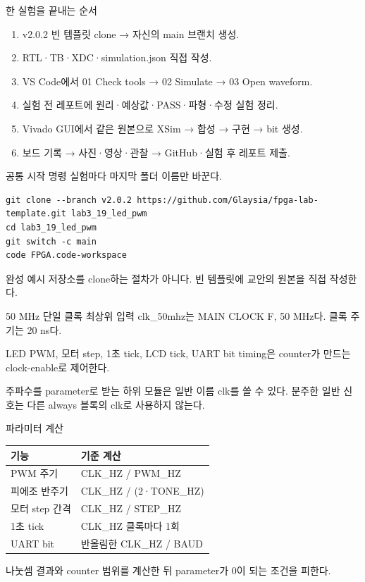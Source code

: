 \begin{frame}{한 실험을 끝내는 순서}
\small
\begin{enumerate}
\item v2.0.2 빈 템플릿 clone → 자신의 main 브랜치 생성.
\item RTL·TB·XDC·simulation.json 직접 작성.
\item VS Code에서 01 Check tools → 02 Simulate → 03 Open waveform.
\item 실험 전 레포트에 원리·예상값·PASS·파형·수정 실험 정리.
\item Vivado GUI에서 같은 원본으로 XSim → 합성 → 구현 → bit 생성.
\item 보드 기록 → 사진·영상·관찰 → GitHub·실험 후 레포트 제출.
\end{enumerate}
\end{frame}
\begin{frame}[fragile]{공통 시작 명령}
\small
실험마다 마지막 폴더 이름만 바꾼다.
\begin{lstlisting}[language={}]
git clone --branch v2.0.2 https://github.com/Glaysia/fpga-lab-template.git lab3_19_led_pwm
cd lab3_19_led_pwm
git switch -c main
code FPGA.code-workspace
\end{lstlisting}
완성 예시 저장소를 clone하는 절차가 아니다. 빈 템플릿에 교안의 원본을 직접 작성한다.
\end{frame}
\begin{frame}[label=timing]{50 MHz 단일 클록}
\small
최상위 입력 clk\_50mhz는 MAIN CLOCK F, 50 MHz다. 클록 주기는 20 ns다.\par\vspace{0.28cm}
LED PWM, 모터 step, 1초 tick, LCD tick, UART bit timing은 counter가 만드는 clock-enable로 제어한다.\par\vspace{0.28cm}
주파수를 parameter로 받는 하위 모듈은 일반 이름 clk를 쓸 수 있다. 분주한 일반 신호는 다른 always 블록의 clk로 사용하지 않는다.
\end{frame}
\begin{frame}{파라미터 계산}
\small
\begin{center}\renewcommand{\arraystretch}{1.35}\begin{tabular}{ll}
기능 & 기준 계산\\\hline
PWM 주기 & CLK\_HZ / PWM\_HZ\\
피에조 반주기 & CLK\_HZ / (2·TONE\_HZ)\\
모터 step 간격 & CLK\_HZ / STEP\_HZ\\
1초 tick & CLK\_HZ 클록마다 1회\\
UART bit & 반올림한 CLK\_HZ / BAUD\\
\end{tabular}\end{center}
나눗셈 결과와 counter 범위를 계산한 뒤 parameter가 0이 되는 조건을 피한다.
\end{frame}
